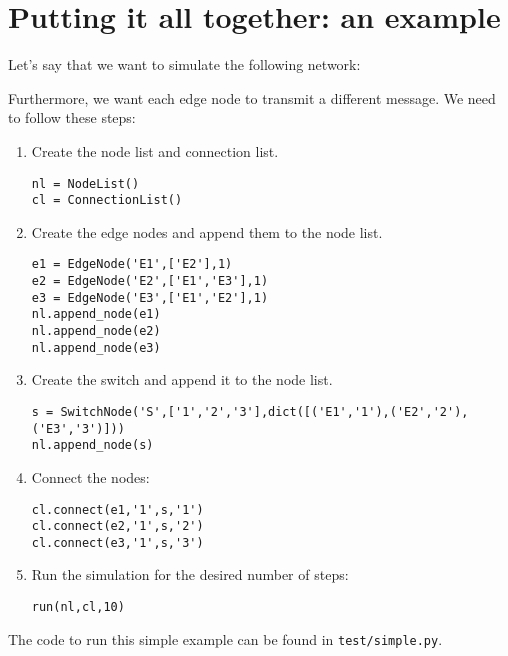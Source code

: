 \documentclass[11pt]{report}
\begin{document}
\section*{Putting it all together: an example}

Let's say that we want to simulate the following network:


Furthermore, we want each edge node to transmit a different message. We need to
follow these steps:

\begin{enumerate}
	\item Create the node list and connection list.
\begin{verbatim}
nl = NodeList()
cl = ConnectionList()
\end{verbatim}
	\item Create the edge nodes and append them to the node list.
\begin{verbatim}
e1 = EdgeNode('E1',['E2'],1)
e2 = EdgeNode('E2',['E1','E3'],1)
e3 = EdgeNode('E3',['E1','E2'],1)
nl.append_node(e1)
nl.append_node(e2)
nl.append_node(e3)
\end{verbatim}
	\item Create the switch and append it to the node list.
\begin{verbatim}
s = SwitchNode('S',['1','2','3'],dict([('E1','1'),('E2','2'),('E3','3')]))
nl.append_node(s)
\end{verbatim}
	\item Connect the nodes:
\begin{verbatim}
cl.connect(e1,'1',s,'1')
cl.connect(e2,'1',s,'2')
cl.connect(e3,'1',s,'3')
\end{verbatim}
	\item Run the simulation for the desired number of steps:
\begin{verbatim}
run(nl,cl,10)
\end{verbatim}
\end{enumerate}

The code to run this simple example can be found in
\texttt{test/simple.py}.
\end{document}
